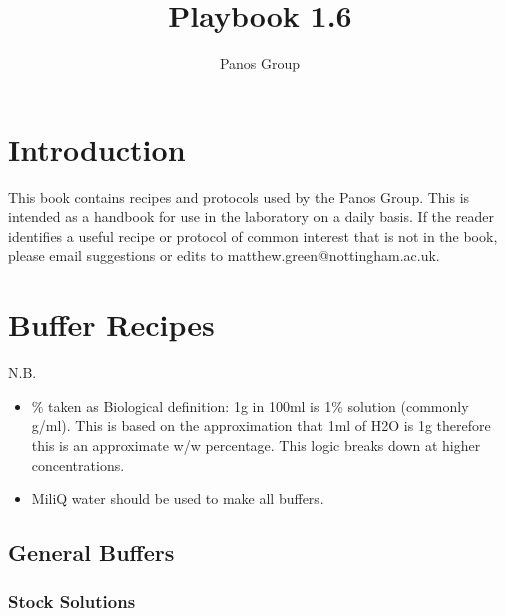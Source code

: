 \documentclass{tufte-book} %
\title{Playbook 1.6} %
\author[Panos Group]{Panos Group} %
\begin{document}
\frontmatter

\maketitle %

\tableofcontents %




\mainmatter


\cleardoublepage
\chapter*{Introduction} %

This book contains recipes and protocols used by the Panos Group. This is intended as a handbook for use in the laboratory on a daily basis. If the reader identifies a useful recipe or protocol of common interest that is not in the book, please email suggestions or edits to matthew.green@nottingham.ac.uk.



\chapter{Buffer Recipes}

N.B.
\begin{itemize}
\item \% taken as Biological definition: 1g in 100ml is 1\% solution (commonly g/ml). This is based on the approximation that 1ml of H2O is 1g therefore this is an approximate w/w percentage. This logic breaks down at higher concentrations.
\item MiliQ water should be used to make all buffers.
\end{itemize}

\section{General Buffers}

\subsection{Stock Solutions}
\end{document}
